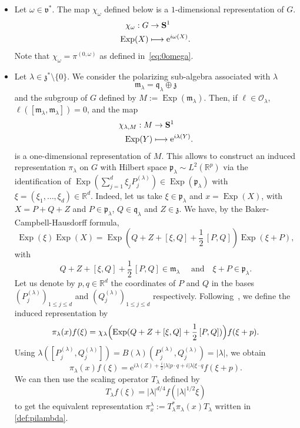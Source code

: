 \documentclass[JEP,XML,SOM,Unicode,published]{cedram}
\let\mathcal\mathscr
\newcommand\mto{\mathchoice{\longmapsto}{\mapsto}{\mapsto}{\mapsto}}
\newcommand{\rme}{\mathrm{e}}
\DeclareMathOperator{\Exp}{Exp}
\theoremstyle{plain}
\theoremstyle{definition}
\def\R{{\mathbb R}}
\begin{document}
\begin{itemize}
\item
Let $\omega \in \mathfrak v ^*$. The map $\chi_\omega$ defined below is a $1$-dimensional representation of $G$.
\begin{align*}
\chi_\omega :G & \to  {\bf S}^1\\
\Exp (X) & \mto \rme^{i\omega(X)}.
\end{align*}
Note that $\chi_\omega=\pi^{(0,\omega)}$ as defined in~\eqref{eq:0omega}.

\item
Let $\lambda\in \mathfrak z^*\setminus\{0\}$. We consider the polarizing sub-algebra associated with $\lambda$
\[
\mathfrak m_\lambda= \mathfrak q_\lambda \oplus \mathfrak z
\]
and the subgroup of $G$ defined by $M:=\Exp (\mathfrak m_\lambda)$. Then, if $\ell\in\mathcal O_\lambda$, $\ell([\mathfrak m_\lambda, \mathfrak m_\lambda])=0$, and the map
\begin{align*}
\chi_{\lambda,M} :M & \to {\bf S}^1\\
\Exp (Y) & \mto \rme^{i\lambda(Y)}.
\end{align*}
is a one-dimensional representation of $M$. This allows to construct an induced representation $\pi_\lambda$ on $G$ with Hilbert space $\mathfrak p_\lambda\sim L^2(\R^p)$ via the identification of $\Exp(\sum_{j=1}^d \xi_j P^{(\lambda)}_j)\in \Exp(\mathfrak p_\lambda)$ with $\xi=(\xi_1,\dots,\xi_d)\in \R^d$.
Indeed, let us take $\xi\in \mathfrak p_\lambda$ and $x=\Exp (X)$, with $X=P+Q+Z$ and $P\in\mathfrak p_\lambda$, $Q\in \mathfrak q_\lambda$ and $Z\in \mathfrak z$. We have, by the Baker-Campbell-Hausdorff formula,
\[
\Exp(\xi) \Exp (X)= \Exp(Q+Z+[\xi, Q] +\frac 12\,[P,Q]) \Exp (\xi+P),
\]
with
\[
Q+Z+[\xi, Q] +\frac 12\,[P,Q]\in \mathfrak m_\lambda\quad \mbox{ and}\quad \xi+P\in\mathfrak p_\lambda.
\]
Let us denote by $p,q\in\R^d$
the coordinates of $P$ and $Q$ in the bases $(P^{(\lambda)}_j)_{1\leq j\leq d}$ and $(Q^{(\lambda)}_j)_{1\leq j\leq d}$ respectively. Following~\cite{CG}, we define the induced representation by
\[
\pi_\lambda(x) f(\xi)= \chi_\lambda\Bigl(\Exp(Q+Z+[\xi, Q] +\frac 12\,[P,Q])\Bigr) f(\xi +p).
\]
Using $\lambda([P_j^{(\lambda)},Q_j^{(\lambda)}])= B(\lambda)(P_j^{(\lambda)},Q_j^{(\lambda)})= |\lambda| $, we obtain
\[
\pi_\lambda(x) f(\xi) = \rme^{i \lambda(Z) +\frac i 2 |\lambda| p\cdot q+i|\lambda| \xi\cdot q} f(\xi+p).
\]
We can then use the scaling operator $T_\lambda$ defined by
\[
T_\lambda f(\xi)= |\lambda|^{d/4} f(|\lambda|^{1/2}\xi)
\]
to get
the equivalent representation $\pi^\lambda_x := T_\lambda ^* \pi_\lambda(x) T_\lambda$ written in \eqref{def:pilambda}.
\end{itemize}
\end{document}
